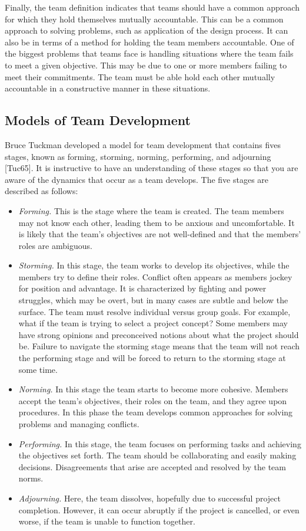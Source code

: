 Finally, the team definition indicates that teams should have a common
approach for which they hold themselves mutually accountable. This can
be a common approach to solving problems, such as application of the
design process. It can also be in terms of a method for holding the team
members accountable. One of the biggest problems that teams face is
handling situations where the team fails to meet a given objective. This
may be due to one or more members failing to meet their commitments. The
team must be able hold each other mutually accountable in a constructive
manner in these situations.

\subsection{Models of Team
Development}\label{models-of-team-development}

Bruce Tuckman developed a model for team development that contains fives
stages, known as forming, storming, norming, performing, and adjourning
{[}Tuc65{]}. It is instructive to have an understanding of these stages
so that you are aware of the dynamics that occur as a team develops. The
five stages are described as follows:

\begin{itemize}
\item
  \emph{Forming.} This is the stage where the team is created. The team
  members may not know each other, leading them to be anxious and
  uncomfortable. It is likely that the team's objectives are not
  well-defined and that the members' roles are ambiguous.
\item
  \emph{Storming.} In this stage, the team works to develop its
  objectives, while the members try to define their roles. Conflict
  often appears as members jockey for position and advantage. It is
  characterized by fighting and power struggles, which may be overt, but
  in many cases are subtle and below the surface. The team must resolve
  individual versus group goals. For example, what if the team is trying
  to select a project concept? Some members may have strong opinions and
  preconceived notions about what the project should be. Failure to
  navigate the storming stage means that the team will not reach the
  performing stage and will be forced to return to the storming stage at
  some time.
\item
  \emph{Norming.} In this stage the team starts to become more cohesive.
  Members accept the team's objectives, their roles on the team, and
  they agree upon procedures. In this phase the team develops common
  approaches for solving problems and managing conflicts.
\item
  \emph{Performing.} In this stage, the team focuses on performing tasks
  and achieving the objectives set forth. The team should be
  collaborating and easily making decisions. Disagreements that arise
  are accepted and resolved by the team norms.
\item
  \emph{Adjourning.} Here, the team dissolves, hopefully due to
  successful project completion. However, it can occur abruptly if the
  project is cancelled, or even worse, if the team is unable to function
  together.
\end{itemize}

